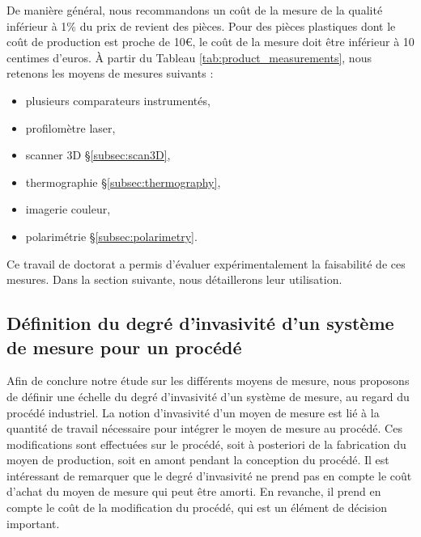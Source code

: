 De manière général, nous recommandons un coût de la mesure de la qualité inférieur à 1\% du prix de revient des pièces.
Pour des pièces plastiques dont le coût de production est proche de 10€, le coût de la mesure doit être inférieur à 10 centimes d'euros.
À partir du Tableau \ref{tab:product_measurements}, nous retenons les moyens de mesures suivants :
\begin{itemize}
	\item plusieurs comparateurs instrumentés,
	\item profilomètre laser,
	\item scanner 3D §\ref{subsec:scan3D},
	\item thermographie §\ref{subsec:thermography},
	\item imagerie couleur,
	\item polarimétrie §\ref{subsec:polarimetry}.
\end{itemize}
%
%
%
Ce travail de doctorat a permis d'évaluer expérimentalement la faisabilité de ces mesures.
Dans la section suivante, nous détaillerons leur utilisation.

\subsection{Définition du degré d'invasivité d'un système de mesure pour un procédé}
Afin de conclure notre étude sur les différents moyens de mesure, nous proposons de définir une échelle du degré d'invasivité d'un système de mesure, au regard du procédé industriel.
La notion d'invasivité d'un moyen de mesure est lié à la quantité de travail nécessaire pour intégrer le moyen de mesure au procédé.
Ces modifications sont effectuées sur le procédé, soit à posteriori de la fabrication du moyen de production, soit en amont pendant la conception du procédé.
Il est intéressant de remarquer que le degré d'invasivité ne prend pas en compte le coût d'achat du moyen de mesure qui peut être amorti.
En revanche, il prend en compte le coût de la modification du procédé, qui est un élément de décision important.

